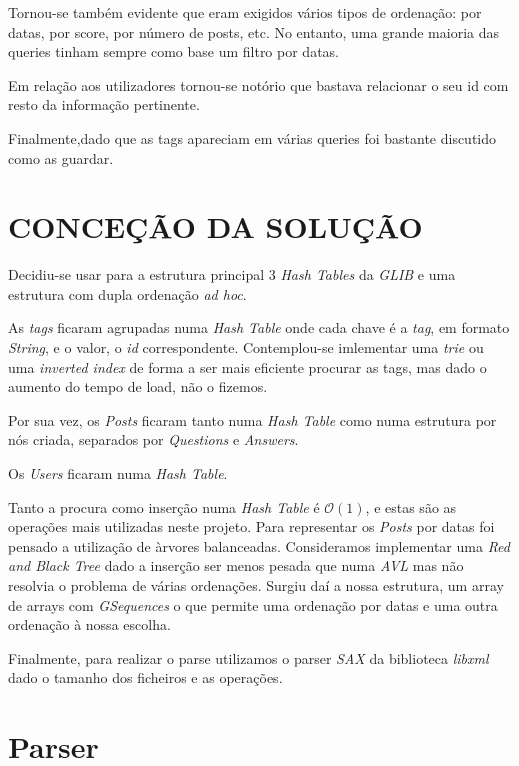 \documentclass[letterpaper, 10 pt, conference]{IEEEtran}  %
\begin{document}
Tornou-se também evidente que eram exigidos vários tipos de ordenação: por datas, por score, por número de posts, etc.  No entanto, uma grande maioria das queries tinham sempre como base um filtro por datas.

Em relação aos utilizadores tornou-se notório que bastava relacionar o seu id com resto da informação pertinente.

Finalmente,dado que as tags apareciam em várias queries foi bastante discutido como as guardar.

\section{CONCEÇÃO DA SOLUÇÃO}

Decidiu-se usar para a estrutura principal 3 \textit{Hash Tables} da \textit{GLIB} e uma estrutura com dupla ordenação \textit{ad hoc}.

As \textit{tags} ficaram agrupadas numa \textit{Hash Table} onde cada chave é a \textit{tag}, em formato \textit{String}, e o valor,  o \textit{id} correspondente.
Contemplou-se imlementar uma \textit{trie} ou uma \textit{inverted index} de forma a ser mais eficiente procurar as tags, mas dado o aumento do tempo de load, não o fizemos.

Por sua vez, os \textit{Posts} ficaram tanto numa \textit{Hash Table} como numa estrutura por nós criada, separados por \textit{Questions} e \textit{Answers}.

Os \textit{Users} ficaram numa \textit{Hash Table}.

Tanto a procura como inserção numa \textit{Hash Table} é $\mathcal{O}(1)$, e estas são as operações mais utilizadas neste projeto.
Para representar os \textit{Posts} por datas foi pensado a utilização de àrvores balanceadas. Consideramos implementar uma \textit{Red and Black Tree} dado a inserção ser menos pesada que numa \textit{AVL} mas não resolvia o problema de várias ordenações. Surgiu daí a nossa estrutura, um array de arrays com \textit{GSequences} o que permite uma ordenação por datas e uma outra ordenação à nossa escolha.

Finalmente, para realizar o parse utilizamos o parser \textit{SAX} da biblioteca \textit{libxml} dado o tamanho dos ficheiros e as operações.

\section{Parser}
\end{document}
